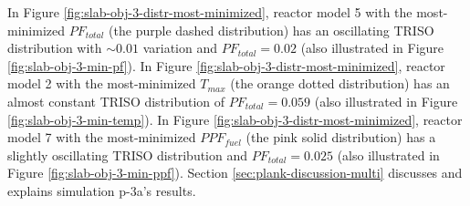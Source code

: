 In Figure \ref{fig:slab-obj-3-distr-most-minimized}, reactor model 5 with the
most-minimized $PF_{total}$ (the purple dashed distribution) has an oscillating TRISO 
distribution with $\sim0.01$ variation and $PF_{total} = 0.02$ 
(also illustrated in Figure \ref{fig:slab-obj-3-min-pf}).
In Figure \ref{fig:slab-obj-3-distr-most-minimized}, reactor model 2 with the 
most-minimized $T_{max}$ (the orange dotted distribution) has an almost constant TRISO 
distribution of $PF_{total}=0.059$ (also illustrated in Figure 
\ref{fig:slab-obj-3-min-temp}). 
In Figure \ref{fig:slab-obj-3-distr-most-minimized}, reactor model 7 with the
most-minimized $PPF_{fuel}$ (the pink solid distribution) has a 
slightly oscillating TRISO distribution and $PF_{total} = 0.025$ 
(also illustrated in Figure \ref{fig:slab-obj-3-min-ppf}).
Section \ref{sec:plank-discussion-multi} discusses and explains simulation p-3a's results.

